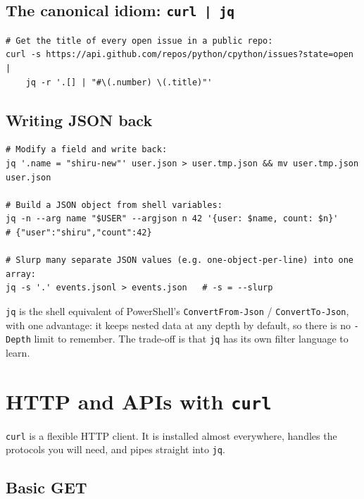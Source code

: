\documentclass[11pt,a4paper]{article}
\newcommand{\pscmd}[1]{\texttt{\textcolor{pwshKw}{#1}}}
\begin{document}
\subsection*{The canonical idiom: \texttt{curl | jq}}

\begin{lstlisting}[style=bashstyle]
# Get the title of every open issue in a public repo:
curl -s https://api.github.com/repos/python/cpython/issues?state=open |
    jq -r '.[] | "#\(.number) \(.title)"'
\end{lstlisting}

\subsection*{Writing JSON back}

\begin{lstlisting}[style=bashstyle]
# Modify a field and write back:
jq '.name = "shiru-new"' user.json > user.tmp.json && mv user.tmp.json user.json

# Build a JSON object from shell variables:
jq -n --arg name "$USER" --argjson n 42 '{user: $name, count: $n}'
# {"user":"shiru","count":42}

# Slurp many separate JSON values (e.g. one-object-per-line) into one array:
jq -s '.' events.jsonl > events.json   # -s = --slurp
\end{lstlisting}

\begin{compareps}
\texttt{jq} is the shell equivalent of PowerShell's
\pscmd{ConvertFrom-Json} / \pscmd{ConvertTo-Json}, with one
advantage: it keeps nested data at any depth by default, so there
is no \texttt{-Depth} limit to remember. The trade-off is that
\texttt{jq} has its own filter language to learn.
\end{compareps}

\section{HTTP and APIs with \texttt{curl}}

\texttt{curl} is a flexible HTTP client. It is installed almost
everywhere, handles the protocols you will need, and pipes straight
into \texttt{jq}.

\subsection*{Basic GET}
\end{document}
